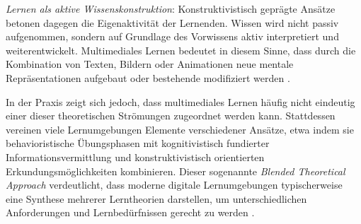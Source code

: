 \textit{Lernen als aktive Wissenskonstruktion}: Konstruktivistisch geprägte Ansätze betonen dagegen die Eigenaktivität der Lernenden. Wissen wird nicht passiv aufgenommen, sondern auf Grundlage des Vorwissens aktiv interpretiert und weiterentwickelt. Multimediales Lernen bedeutet in diesem Sinne, dass durch die Kombination von Texten, Bildern oder Animationen neue mentale Repräsentationen aufgebaut oder bestehende modifiziert werden \parencite[S.~64]{furstenau_lehr-lern-theorien_2019}.

In der Praxis zeigt sich jedoch, dass multimediales Lernen häufig nicht eindeutig einer dieser theoretischen Strömungen zugeordnet werden kann. Stattdessen vereinen viele Lernumgebungen Elemente verschiedener Ansätze, etwa indem sie behavioristische Übungsphasen mit kognitivistisch fundierter Informationsvermittlung und konstruktivistisch orientierten Erkundungsmöglichkeiten kombinieren. Dieser sogenannte \textit{Blended Theoretical Approach} verdeutlicht, dass moderne digitale Lernumgebungen typischerweise eine Synthese mehrerer Lerntheorien darstellen, um unterschiedlichen Anforderungen und Lernbedürfnissen gerecht zu werden \parencites[S.~186]{picciano_theories_2021}[S.~37]{liu_theoretical_2024}.

